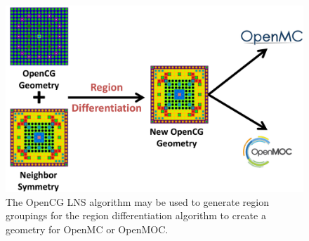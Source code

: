 \begin{figure}[h!]
  \centering
  \includegraphics[width=0.8\linewidth]{figures/workflow/opencg/region-diff-proc-diagram}
  \caption[OpenCG region differentiation process diagram]{The OpenCG \ac{LNS} algorithm may be used to generate region groupings for the region differentiation algorithm to create a geometry for OpenMC or OpenMOC.}
  \label{fig:region-diff-proc-diagram}
\end{figure}
